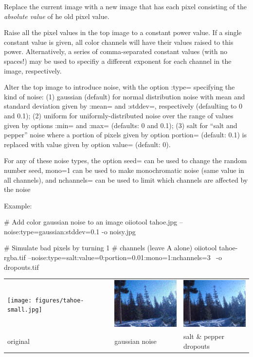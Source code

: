 Replace the current image with a new image that has each pixel
consisting of the \emph{absolute value} of he old pixel value.
\apiend

Raise all the pixel values in the top image to a constant power value.
If a single constant value is given, all color channels will have their values
raised to this power.  Alternatively, a series of
comma-separated constant values (with no spaces!) may be used to specifiy a
different exponent for each channel in the image, respectively.
\apiend

Alter the top image to introduce noise, with the option {\cf :type=}
specifying the kind of noise: (1) {\cf gaussian} (default) for normal
distribution noise with mean and standard deviation given by {\cf :mean=}
and {\cf :stddev=}, respectively (defaulting to 0 and 0.1); (2) {\cf
uniform} for uniformly-distributed noise over the range of values given by
options {\cf :min=} and {\cf :max=} (defaults: 0 and 0.1); (3) {\cf salt}
for ``salt and pepper'' noise where a portion of pixels given by  option
{\cf portion=} (default: 0.1) is replaced with value given by option {\cf
value=} (default: 0).

For any of these noise types, the option {\cf seed=} can be used to change
the random number seed, {\cf mono=1} can be used to make monochromatic noise
(same value in all channels), and {\cf nchannels=} can be used to limit
which channels are affected by the noise

\noindent Example:
\begin{code}
    # Add color gaussian noise to an image
    oiiotool tahoe.jpg --noise:type=gaussian:stddev=0.1 -o noisy.jpg

    # Simulate bad pixels by turning 1%
    # channels (leave A alone)
    oiiotool tahoe-rgba.tif --noise:type=salt:value=0:portion=0.01:mono=1:nchannels=3 \
        -o dropouts.tif
\end{code}

\spc \begin{tabular}{lll}
\texttt{[image: figures/tahoe-small.jpg]} &
\includegraphics[width=1.5in]{figures/tahoe-gauss.jpg} &
\includegraphics[width=1.5in]{figures/tahoe-pepper.jpg} \\
original & gaussian noise & salt \& pepper dropouts \\
\end{tabular}
\apiend

